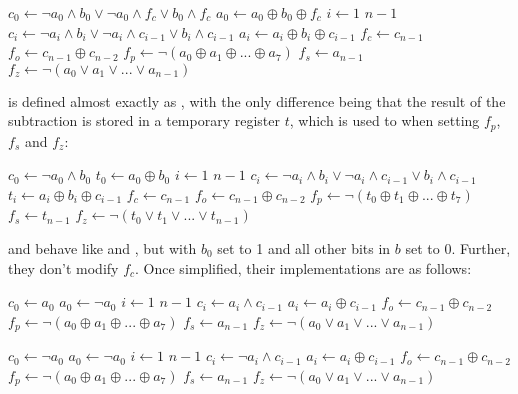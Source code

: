 \documentclass[a4paper,11pt]{kth-mag}
\renewcommand{\gets}{\leftarrow}
\newcommand{\AND}{\land}
\newcommand{\IOR}{\lor}
\newcommand{\XOR}{\oplus}
\newcommand{\NOT}{\lnot}
\begin{document}
\begin{codebox}
\zi $c_0 \gets \NOT a_0 \AND b_0 \IOR \NOT a_0 \AND f_c \IOR b_0 \AND f_c$
\zi $a_0 \gets a_0 \XOR b_0 \XOR f_c$
\zi \For $i \gets 1$ \To $n-1$ \Do
\zi   $c_i \gets \NOT a_i \AND b_i \IOR \NOT a_i \AND c_{i-1} \IOR b_i \AND c_{i-1}$
\zi   $a_i \gets a_i \XOR b_i \XOR c_{i-1}$ \End
\zi $f_c \gets c_{n-1}$
\zi $f_o \gets c_{n-1} \XOR c_{n-2}$
\zi $f_p \gets \NOT(a_0 \XOR a_1 \XOR ... \XOR a_7)$
\zi $f_s \gets a_{n-1}$
\zi $f_z \gets \NOT(a_0 \IOR a_1 \IOR ... \IOR a_{n-1})$
\end{codebox}

 is defined almost exactly as , with the only difference being that the result of the subtraction is stored in a temporary register $t$, which is used to when setting $f_p$, $f_s$ and $f_z$:

\begin{codebox}
\zi $c_0 \gets \NOT a_0 \AND b_0$
\zi $t_0 \gets a_0 \XOR b_0$
\zi \For $i \gets 1$ \To $n-1$ \Do
\zi   $c_i \gets \NOT a_i \AND b_i \IOR \NOT a_i \AND c_{i-1} \IOR b_i \AND c_{i-1}$
\zi   $t_i \gets a_i \XOR b_i \XOR c_{i-1}$ \End
\zi $f_c \gets c_{n-1}$
\zi $f_o \gets c_{n-1} \XOR c_{n-2}$
\zi $f_p \gets \NOT(t_0 \XOR t_1 \XOR ... \XOR t_7)$
\zi $f_s \gets t_{n-1}$
\zi $f_z \gets \NOT(t_0 \IOR t_1 \IOR ... \IOR t_{n-1})$
\end{codebox}

 and  behave like  and , but with $b_0$ set to 1 and all other bits in $b$ set to 0.
Further, they don't modify $f_c$.
Once simplified, their implementations are as follows:

\begin{codebox}
\zi $c_0 \gets a_0$
\zi $a_0 \gets \NOT a_0$
\zi \For $i \gets 1$ \To $n-1$ \Do
\zi   $c_i \gets a_i \AND c_{i-1}$
\zi   $a_i \gets a_i \XOR c_{i-1}$ \End
\zi $f_o \gets c_{n-1} \XOR c_{n-2}$
\zi $f_p \gets \NOT(a_0 \XOR a_1 \XOR ... \XOR a_7)$
\zi $f_s \gets a_{n-1}$
\zi $f_z \gets \NOT(a_0 \IOR a_1 \IOR ... \IOR a_{n-1})$
\end{codebox}

\begin{codebox}
\zi $c_0 \gets \NOT a_0$
\zi $a_0 \gets \NOT a_0$
\zi \For $i \gets 1$ \To $n-1$ \Do
\zi   $c_i \gets \NOT a_i \AND c_{i-1}$
\zi   $a_i \gets a_i \XOR c_{i-1}$ \End
\zi $f_o \gets c_{n-1} \XOR c_{n-2}$
\zi $f_p \gets \NOT(a_0 \XOR a_1 \XOR ... \XOR a_7)$
\zi $f_s \gets a_{n-1}$
\zi $f_z \gets \NOT(a_0 \IOR a_1 \IOR ... \IOR a_{n-1})$
\end{codebox}
\end{document}
